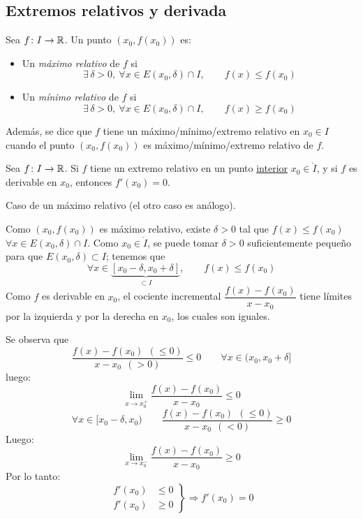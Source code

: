 \documentclass[11pt,a4paper]{article}
\begin{document}
\subsection{Extremos relativos y derivada}

\begin{definicion}
  Sea $f\colon I\to\mathbb{R}$. Un punto $(x_0,f(x_0))$ es:
  \begin{itemize}
    \item[--] Un \emph{máximo relativo} de $f$ si
      \[
        \exists\,\delta>0,\ \forall x\in E(x_0,\delta)\cap I,\qquad
        f(x)\leq f(x_0)
      \]
    \item[--] Un \emph{mínimo relativo} de $f$ si
      \[
        \exists\,\delta>0,\ \forall x\in E(x_0,\delta)\cap I,\qquad
        f(x)\geq f(x_0)
      \]
  \end{itemize}

  Además, se dice que $f$ tiene un máximo/mínimo/extremo relativo en
  $x_0\in I$ cuando el punto $(x_0,f(x_0))$ es
  máximo/mínimo/extremo relativo de $f$.
\end{definicion}

\begin{proposicion}
  Sea $f\colon I\to\mathbb{R}$. Si $f$ tiene un extremo relativo en un punto
  \underline{interior} $x_0\in\mathring{I}$, y si $f$ es derivable en
  $x_0$, entonces $f'(x_0)=0$.
\end{proposicion}

\begin{demo}
  Caso de un máximo relativo (el otro caso es análogo).

  Como $(x_0,f(x_0))$ es máximo relativo, existe $\delta>0$ tal que
  $f(x)\leq f(x_0)$ $\forall x\in E(x_0,\delta)\cap I$. Como
  $x_0\in\mathring{I}$, se puede tomar $\delta>0$ suficientemente pequeño
  para que $E(x_0,\delta)\subset I$; tenemos que
  \[
    \forall x\in\underbrace{[x_0-\delta,x_0+\delta]}_{\subset I},\qquad
    f(x)\leq f(x_0)
  \]
  Como $f$ es derivable en $x_0$, el cociente incremental
  $\dfrac{f(x)-f(x_0)}{x-x_0}$ tiene límites por la izquierda y por la
  derecha en $x_0$, los cuales son iguales.

  Se observa que
  \[
    \frac{f(x)-f(x_0)\ \ (\leq 0)}{x-x_0\ \ (>0)}\leq 0
    \qquad\forall x\in(x_0,x_0+\delta]
  \]
  luego:
  \[
    \lim_{x\to x_0^+}
    \frac{f(x)-f(x_0)}{x-x_0}\leq 0
  \]
  \[
    \forall x\in[x_0-\delta,x_0)\qquad
    \frac{f(x)-f(x_0)\ \ (\leq 0)}{x-x_0\ \ (<0)}\geq 0
  \]
  Luego:
  \[
    \lim_{x\to x_0^-}\frac{f(x)-f(x_0)}{x-x_0}\geq 0
  \]
  Por lo tanto:
  \[
    \left.\begin{aligned}
      f'(x_0)&\leq 0\\
      f'(x_0)&\geq 0
    \end{aligned}\right\}
    \Longrightarrow f'(x_0)=0
  \]
\end{demo}
\end{document}
